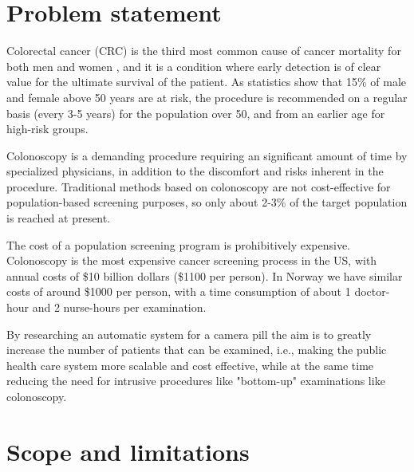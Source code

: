 \documentclass[thesis.tex]{subfiles}
\begin{document}
\section{Problem statement} \label{sec:problem_statment}
Colorectal cancer (CRC) is the third most common cause of cancer mortality for both men and women \cite{CancerStatistics10}, and it is a condition where early detection is of clear value for the ultimate survival of the patient. As statistics show that 15\% of male and female above 50 years are at risk, the procedure is recommended on a regular basis (every 3-5 years) for the population over 50, and from an earlier age for high-risk groups. 

Colonoscopy is a demanding procedure requiring an significant amount of time by specialized physicians, in addition to the discomfort and risks inherent in the procedure. Traditional methods based on colonoscopy are not cost-effective for population-based screening purposes, so only about 2-3\% of the target population is reached at present. 

The cost of a population screening program is prohibitively expensive. Colonoscopy is the most expensive cancer screening process in the US, with annual costs of \$10 billion dollars (\$1100 per person). In Norway we have similar costs of around \$1000 per person, with a time consumption of about 1 doctor-hour and 2 nurse-hours per examination. 

By researching an automatic system for a camera pill the aim is to greatly increase the number of patients that can be examined, i.e., making the public health care system more scalable and cost effective, while at the same time reducing the need for intrusive procedures like "bottom-up" examinations like colonoscopy.


\section{Scope and limitations} \label{sec:scope_and_limitations}

\end{document}
